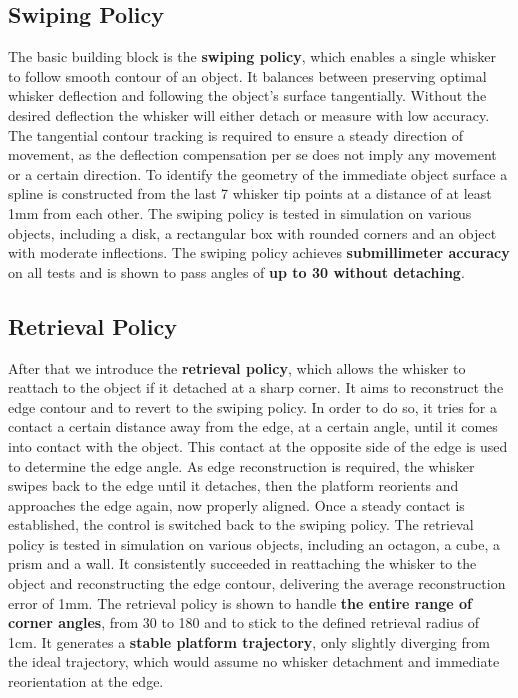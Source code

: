 \subsection{Swiping Policy}
The basic building block is the \textbf{swiping policy}, which enables a single whisker to follow smooth contour of an object.
It balances between preserving optimal whisker deflection and following the object's surface tangentially.
Without the desired deflection the whisker will either detach or measure with low accuracy.
The tangential contour tracking is required to ensure a steady direction of movement, as the deflection compensation per se does not imply any movement or a certain direction.
To identify the geometry of the immediate object surface a spline is constructed from the last 7 whisker tip points at a distance of at least 1mm from each other.
The swiping policy is tested in simulation on various objects, including a disk, a rectangular box with rounded corners and an object with moderate inflections.
The swiping policy achieves \textbf{submillimeter accuracy} on all tests and is shown to pass angles of \textbf{up to 30\degree{} without detaching}.

\subsection{Retrieval Policy}
After that we introduce the \textbf{retrieval policy}, which allows the whisker to reattach to the object if it detached at a sharp corner.
It aims to reconstruct the edge contour and to revert to the swiping policy.
In order to do so, it tries for a contact a certain distance away from the edge, at a certain angle, until it comes into contact with the object.
This contact at the opposite side of the edge is used to determine the edge angle.
As edge reconstruction is required, the whisker swipes back to the edge until it detaches, then the platform reorients and approaches the edge again, now properly aligned.
Once a steady contact is established, the control is switched back to the swiping policy.
The retrieval policy is tested in simulation on various objects, including an octagon, a cube, a prism and a wall.
It consistently succeeded in reattaching the whisker to the object and reconstructing the edge contour, delivering the average reconstruction error of 1mm.
The retrieval policy is shown to handle \textbf{the entire range of corner angles}, from 30\degree{} to 180\degree{} and to stick to the defined retrieval radius of 1cm.
It generates a \textbf{stable platform trajectory}, only slightly diverging from the ideal trajectory, which would assume no whisker detachment and immediate reorientation at the edge.


